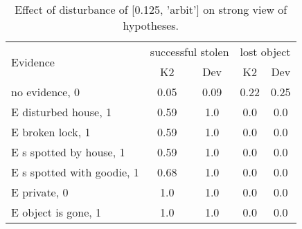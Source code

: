 \begin{table}\begin{tabular}{l|cc|cc}\toprule\multirow{2}{*}{Evidence} & \multicolumn{2}{c}{successful stolen}& \multicolumn{2}{c}{lost object}\\& {K2} & {Dev}& {K2} & {Dev}\\\midrule
no evidence, 0 & 0.05&0.09&0.22&0.25\\E disturbed house, 1 & \cellcolor{Bittersweet}0.59&\cellcolor{Bittersweet}1.0&0.0&0.0\\E broken lock, 1 & \cellcolor{Bittersweet}0.59&\cellcolor{Bittersweet}1.0&0.0&0.0\\E s spotted by house, 1 & \cellcolor{Bittersweet}0.59&\cellcolor{Bittersweet}1.0&0.0&0.0\\E s spotted with goodie, 1 & \cellcolor{Bittersweet}0.68&\cellcolor{Bittersweet}1.0&0.0&0.0\\E private, 0 & 1.0&1.0&0.0&0.0\\E object is gone, 1 & 1.0&1.0&0.0&0.0\\\bottomrule\end{tabular}\caption{Effect of disturbance of [0.125, 'arbit'] on strong view of hypotheses.}\end{table}